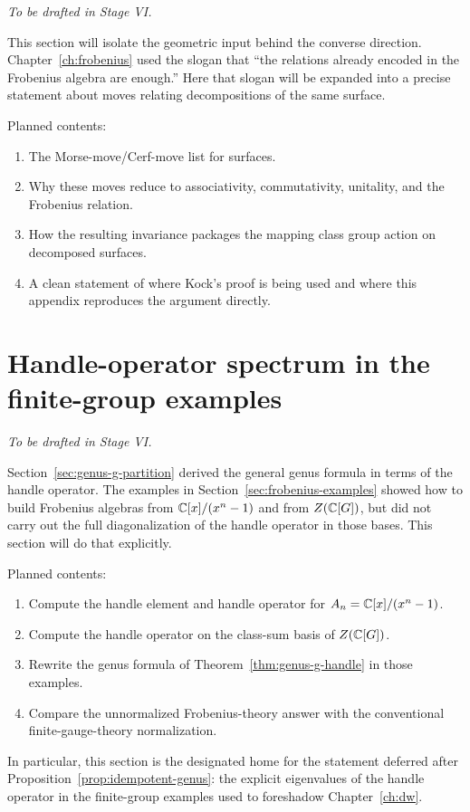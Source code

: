 \emph{To be drafted in Stage VI.}

This section will isolate the geometric input behind the converse direction. Chapter~\ref{ch:frobenius} used the slogan that ``the relations already encoded in the Frobenius algebra are enough.'' Here that slogan will be expanded into a precise statement about moves relating decompositions of the same surface.

\medskip

\noindent Planned contents:
\begin{enumerate}
\item The Morse-move/Cerf-move list for surfaces.
\item Why these moves reduce to associativity, commutativity, unitality, and the Frobenius relation.
\item How the resulting invariance packages the mapping class group action on decomposed surfaces.
\item A clean statement of where Kock's proof is being used and where this appendix reproduces the argument directly.
\end{enumerate}

\section{Handle-operator spectrum in the finite-group examples}\label{appsec:handle-spectrum}

\emph{To be drafted in Stage VI.}

Section~\ref{sec:genus-g-partition} derived the general genus formula in terms of the handle operator. The examples in Section~\ref{sec:frobenius-examples} showed how to build Frobenius algebras from $\mathbb{C}[x]/(x^n-1)$ and from $Z(\mathbb{C}[G])$, but did not carry out the full diagonalization of the handle operator in those bases. This section will do that explicitly.

\medskip

\noindent Planned contents:
\begin{enumerate}
\item Compute the handle element and handle operator for $A_n=\mathbb{C}[x]/(x^n-1)$.
\item Compute the handle operator on the class-sum basis of $Z(\mathbb{C}[G])$.
\item Rewrite the genus formula of Theorem~\ref{thm:genus-g-handle} in those examples.
\item Compare the unnormalized Frobenius-theory answer with the conventional finite-gauge-theory normalization.
\end{enumerate}

\medskip

\noindent In particular, this section is the designated home for the statement deferred after Proposition~\ref{prop:idempotent-genus}: the explicit eigenvalues of the handle operator in the finite-group examples used to foreshadow Chapter~\ref{ch:dw}.
